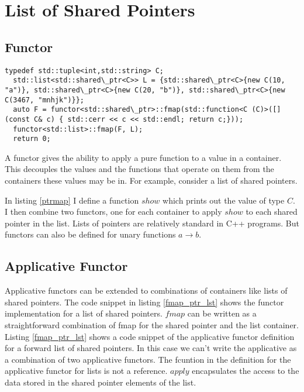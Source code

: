 \documentclass[12pt,fleqn]{article}
\begin{document}
%
\section{List of Shared Pointers}
%
%
%

\subsection{Functor}
%
%


%
%
\begin{minipage}{\linewidth}
\begin{lstlisting}[caption=mapping over a list of shared pointers, label=ptrmap]
  typedef std::tuple<int,std::string> C;
  std::list<std::shared\_ptr<C>> L = {std::shared\_ptr<C>{new C(10, "a")}, std::shared\_ptr<C>{new C(20, "b")}, std::shared\_ptr<C>{new C(3467, "mnhjk")}};
  auto F = functor<std::shared\_ptr>::fmap(std::function<C (C)>([](const C& c) { std::cerr << c << std::endl; return c;}));
  functor<std::list>::fmap(F, L);
  return 0;
\end{lstlisting}
\end{minipage}
%
%
%

A functor gives the ability to apply a pure function to a value in a container.
This decouples the values and the functions that operate on them from the containers these values may be in.
For example, consider a list of shared pointers.

In listing \ref{ptrmap} I define a function $show$ which prints out the value of type $C$. I then combine two functors, one for each container to apply $show$ 
to each shared pointer in the list.
Lists of pointers are relatively standard in C++ programs. But functors can also be defined for unary functions $a \rightarrow b$.

%
%
%
\subsection{Applicative Functor}
%
%

Applicative functors can be extended to combinations of containers like lists of shared pointers.
The code snippet in listing \ref{fmap_ptr_lst} shows the functor implementation for a list of shared pointers.
$fmap$ can be written as a straightforward combination of fmap for the shared pointer and the list container.
Listing \ref{fmap_ptr_lst} shows a code snippet of the applicative functor definition for a forward list of shared pointers.
In this case we can't write the applicative as a combination of two applicative functors. 
The fcuntion in the definition for the applicative functor for lists is not a reference.
$apply$ encapsulates the access to the data stored in the shared pointer elements of the list.
\end{document}
